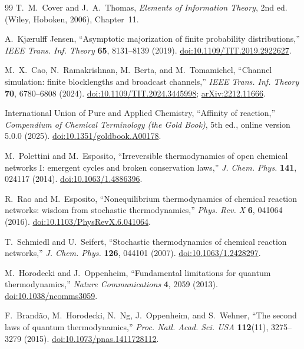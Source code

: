 \documentclass[11pt]{article}
\theoremstyle{definition}
\theoremstyle{remark}
\begin{document}
\begin{thebibliography}{99}
T.~M.~Cover and J.~A.~Thomas,
\emph{Elements of Information Theory}, 2nd ed. (Wiley, Hoboken, 2006),
Chapter~11.

A.~Kj{\ae}rulff Jensen,
``Asymptotic majorization of finite probability distributions,''
\emph{IEEE Trans. Inf. Theory} \textbf{65}, 8131--8139 (2019).
\href{https://doi.org/10.1109/TIT.2019.2922627}
{doi:10.1109/TIT.2019.2922627}.

M.~X.~Cao, N.~Ramakrishnan, M.~Berta, and M.~Tomamichel,
``Channel simulation: finite blocklengths and broadcast channels,''
\emph{IEEE Trans. Inf. Theory} \textbf{70}, 6780--6808 (2024).
\href{https://doi.org/10.1109/TIT.2024.3445998}
{doi:10.1109/TIT.2024.3445998};
\href{https://arxiv.org/abs/2212.11666}{arXiv:2212.11666}.

International Union of Pure and Applied Chemistry,
``Affinity of reaction,''
\emph{Compendium of Chemical Terminology (the Gold Book)}, 5th ed.,
online version 5.0.0 (2025).
\href{https://doi.org/10.1351/goldbook.A00178}
{doi:10.1351/goldbook.A00178}.

M.~Polettini and M.~Esposito,
``Irreversible thermodynamics of open chemical networks I:
emergent cycles and broken conservation laws,''
\emph{J. Chem. Phys.} \textbf{141}, 024117 (2014).
\href{https://doi.org/10.1063/1.4886396}{doi:10.1063/1.4886396}.

R.~Rao and M.~Esposito,
``Nonequilibrium thermodynamics of chemical reaction networks:
wisdom from stochastic thermodynamics,''
\emph{Phys. Rev. X} \textbf{6}, 041064 (2016).
\href{https://doi.org/10.1103/PhysRevX.6.041064}
{doi:10.1103/PhysRevX.6.041064}.

T.~Schmiedl and U.~Seifert,
``Stochastic thermodynamics of chemical reaction networks,''
\emph{J. Chem. Phys.} \textbf{126}, 044101 (2007).
\href{https://doi.org/10.1063/1.2428297}{doi:10.1063/1.2428297}.

M.~Horodecki and J.~Oppenheim,
``Fundamental limitations for quantum thermodynamics,''
\emph{Nature Communications} \textbf{4}, 2059 (2013).
\href{https://doi.org/10.1038/ncomms3059}{doi:10.1038/ncomms3059}.

F.~Brand\~ao, M.~Horodecki, N.~Ng, J.~Oppenheim, and S.~Wehner,
``The second laws of quantum thermodynamics,''
\emph{Proc. Natl. Acad. Sci. USA} \textbf{112}(11), 3275--3279 (2015).
\href{https://doi.org/10.1073/pnas.1411728112}
{doi:10.1073/pnas.1411728112}.


\end{thebibliography}
\end{document}
